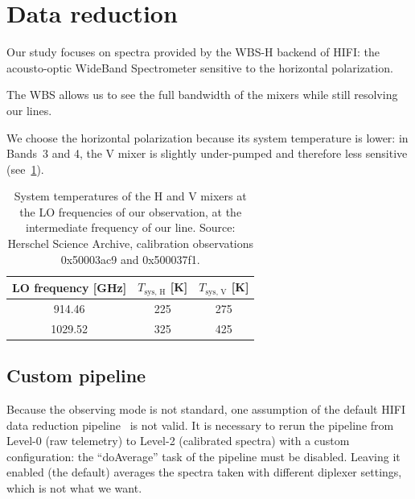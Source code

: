 \FloatBarrier
\section{Data reduction}
\label{sec:s140_data_reduction}
Our study focuses on spectra provided by the WBS-H backend of HIFI: the acousto-optic WideBand Spectrometer sensitive to the horizontal polarization.

The WBS allows us to see the full bandwidth of the mixers while still resolving our lines.

We choose the horizontal polarization because its system temperature is lower: in Bands~3 and 4, the V mixer is slightly under-pumped and therefore less sensitive (see~\cref{tab:chapter5_tsys}).

\begin{table}
    \centering
    \begin{tabular}{ccc}
        \toprule
        LO frequency [\si{\giga\hertz}] &
        $T_\text{sys, H}$ [\si{\kelvin}] &
        $T_\text{sys, V}$ [\si{\kelvin}]\\
        \midrule
        \num{914.46}   &   225   &   275 \\ %
        \num{1029.52}  &   325   &   425 \\ %
        \bottomrule
    \end{tabular}
    \caption{
        System temperatures of the H and V mixers at the LO frequencies of our observation, at the intermediate frequency of our line.
        Source: Herschel Science Archive, calibration observations 0x50003ac9
        and 0x500037f1.
    }
    \label{tab:chapter5_tsys}
\end{table}



\subsection{Custom pipeline}

Because the observing mode is not standard, one assumption of the default HIFI data reduction pipeline~\parencite{hifiobserversmanual} is not valid.
It is necessary to rerun the pipeline from Level-0 (raw telemetry) to Level-2 (calibrated spectra) with a custom configuration:
the ``doAverage'' task of the pipeline must be disabled.
Leaving it enabled (the default) averages the spectra taken with different diplexer settings, which is not what we want.



